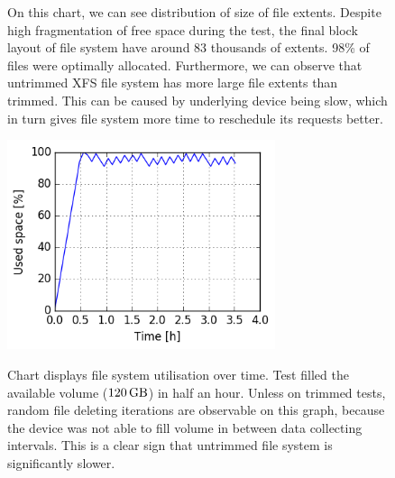 \documentclass[
  color, %
  table, %
  lof,   %
  lot,   %
]{fithesis3}
\begin{document}
\begin{figure}[h]
    \centering
    \caption[Size distribution of file extents of XFS during testing on SSD without regular trimming]{On this chart, we can see distribution of size of file extents. Despite high fragmentation of free space during the test, the final block layout of file system have around 83 thousands of extents. 98\% of files were optimally allocated. Furthermore, we can observe that untrimmed XFS file system has more large file extents than trimmed. This can be caused by underlying device being slow, which in turn gives file system more time to reschedule its requests better.}
    \label{fig:used_xfs_ssd_notrim}
\end{figure}

\begin{figure}[!h]
    \begin{minipage}{\textwidth}
        \centering
        \includegraphics[width=0.7\textwidth]{../charts/SSD_xfs_notrim/usage.png}
        \caption[Usage of available space of XFS during testing on SSD without regular trimming]{Chart displays file system utilisation over time. Test filled the available volume ($\SI{120}{\giga\byte}$) in half an hour. Unless on trimmed tests, random file deleting iterations are observable on this graph, because the device was not able to fill volume in between data collecting intervals. This is a clear sign that untrimmed file system is significantly slower.}
\label{fig:usage_ext4_ssd_notrim}
\label{fig:usage_xfs_ssd_notrim}
    \end{minipage}
\end{figure}
\end{document}
